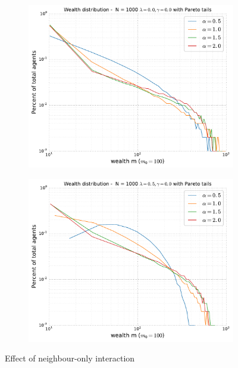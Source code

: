 \documentclass[10pt, a4paper]{amsart}
\begin{document}
\begin{figure}
\begin{subfigure}{.49\textwidth}
	\centering
	\includegraphics[width=\linewidth]{../figures/5d/5d_0-var-0.pdf}
	\caption{}
	\label{fig:neighbour1}
\end{subfigure}
\begin{subfigure}{.49\textwidth}
	\centering
	\includegraphics[width=\linewidth]{../figures/5d/5d_05-var-0.pdf}
	\caption{}
	\label{fig:neighbour2}
\end{subfigure}
\caption{Effect of neighbour-only interaction}
\end{figure}
\end{document}
